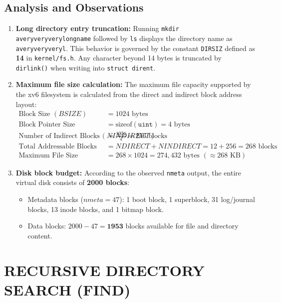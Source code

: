 \documentclass[12pt,a4paper]{report}
\numberwithin{equation}{chapter}
\numberwithin{figure}{chapter}
\numberwithin{table}{chapter}
\begin{document}
\section{Analysis and Observations}
\begin{enumerate}
    \item \textbf{Long directory entry truncation:}
    Running \texttt{mkdir averyveryverylongname} followed by \texttt{ls} displays the directory name as \texttt{averyveryveryl}. This behavior is governed by the constant \texttt{DIRSIZ} defined as \textbf{14} in \texttt{kernel/fs.h}. Any character beyond 14 bytes is truncated by \texttt{dirlink()} when writing into \texttt{struct dirent}.
    \item \textbf{Maximum file size calculation:}
    The maximum file capacity supported by the xv6 filesystem is calculated from the direct and indirect block address layout:
    \begin{align}
        \text{Block Size } (BSIZE) &= 1024 \text{ bytes} \\
        \text{Block Pointer Size} &= \text{sizeof}(\texttt{uint}) = 4 \text{ bytes} \\
        \text{Number of Indirect Blocks } (NINDIRECT) &= \frac{1024}{4} = 256 \text{ blocks} \\
        \text{Total Addressable Blocks} &= NDIRECT + NINDIRECT = 12 + 256 = 268 \text{ blocks} \\
        \text{Maximum File Size} &= 268 \times 1024 = 274,432 \text{ bytes } (\approx 268 \text{ KB})
    \end{align}
    \item \textbf{Disk block budget:}
    According to the observed \texttt{nmeta} output, the entire virtual disk consists of \textbf{2000 blocks}:
    \begin{itemize}
        \item Metadata blocks ($nmeta = 47$): 1 boot block, 1 superblock, 31 log/journal blocks, 13 inode blocks, and 1 bitmap block.
        \item Data blocks: $2000 - 47 = \textbf{1953}$ blocks available for file and directory content.
    \end{itemize}
\end{enumerate}

\chapter{RECURSIVE DIRECTORY SEARCH (FIND)}
\end{document}
